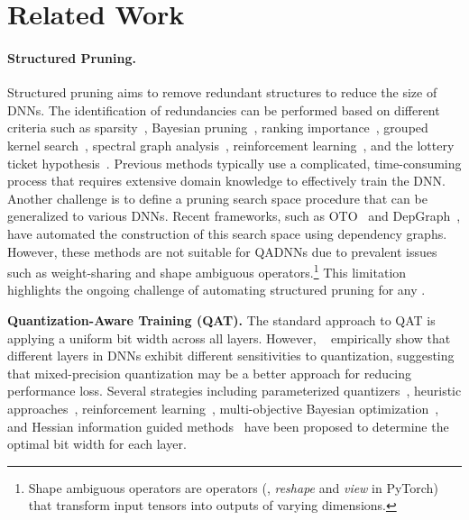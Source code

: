 \section{Related Work}
\paragraph{Structured Pruning.} Structured pruning aims to remove redundant structures to reduce the size of DNNs. The identification of redundancies can be performed based on different criteria such as  sparsity~\cite{lin2019toward,wen2016learning,zhuang2020neuron,chen2017reduced,chen2018farsa,chen2021orthant,otov1,gao2020highly,meng2020pruning,yang2020deephoyer,frantar2023sparsegpt,idelbayev2022exploring}, Bayesian pruning~\cite{zhou2019accelerate,van2020bayesian}, ranking importance~\cite{li2020eagleeye,li2019exploiting,zhang2018systematic,otov2}, grouped kernel search~\cite{zhong2023one}, spectral graph analysis~\cite{laenen2023one}, reinforcement learning~\cite{he2018amc,chen2020storage}, and the lottery ticket hypothesis~\cite{frankle2018lottery,frankle2020linear}. %
Previous methods typically use a complicated, time-consuming process that requires extensive domain knowledge to effectively train the DNN. %
Another challenge is to define a pruning search space procedure that can be generalized to various DNNs. %
Recent frameworks, such as OTO~\cite{otov2,otov3,hesso} and DepGraph~\cite{fang2023depgraph}, have automated the construction of this search space using dependency graphs. However, these methods are not suitable for QADNNs due to prevalent issues such as weight-sharing and shape ambiguous operators.\footnote{Shape ambiguous operators are  operators (\eg, \textit{reshape} and \textit{view} in PyTorch) that transform input tensors into outputs of varying dimensions.} This limitation highlights the ongoing challenge of automating structured pruning for any \qadnn{}.



\smallskip
\noindent \textbf{Quantization-Aware Training (QAT).} The standard approach to QAT is applying a  uniform bit width across all layers. However, ~\cite{dong2019hawq,hong2022cadyq} empirically show that different layers in DNNs exhibit different sensitivities to quantization, suggesting that mixed-precision quantization may be a better approach for reducing performance loss. Several strategies including parameterized quantizers~\cite{goodparam}, heuristic approaches~\cite{QST}, reinforcement learning~\cite{elthakeb2020releq,balaskas2024hardware}, multi-objective Bayesian optimization~\cite{miriyala2024mixed}, and Hessian information guided methods~\cite{dong2019hawq,dong2020hawq,yao2021hawq} have been proposed to determine the optimal bit width for each layer.

